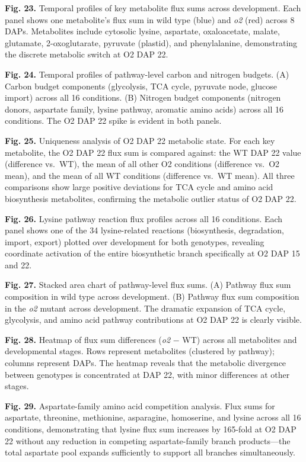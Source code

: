 \documentclass[12pt,a4paper]{article}
\begin{document}
\textbf{Fig. 23.} Temporal profiles of key metabolite flux sums across development. Each panel shows one metabolite's flux sum in wild type (blue) and \textit{o2} (red) across 8 DAPs. Metabolites include cytosolic lysine, aspartate, oxaloacetate, malate, glutamate, 2-oxoglutarate, pyruvate (plastid), and phenylalanine, demonstrating the discrete metabolic switch at O2 DAP 22.

\textbf{Fig. 24.} Temporal profiles of pathway-level carbon and nitrogen budgets. (A) Carbon budget components (glycolysis, TCA cycle, pyruvate node, glucose import) across all 16 conditions. (B) Nitrogen budget components (nitrogen donors, aspartate family, lysine pathway, aromatic amino acids) across all 16 conditions. The O2 DAP 22 spike is evident in both panels.

\textbf{Fig. 25.} Uniqueness analysis of O2 DAP 22 metabolic state. For each key metabolite, the O2 DAP 22 flux sum is compared against: the WT DAP 22 value (difference vs.\ WT), the mean of all other O2 conditions (difference vs.\ O2 mean), and the mean of all WT conditions (difference vs.\ WT mean). All three comparisons show large positive deviations for TCA cycle and amino acid biosynthesis metabolites, confirming the metabolic outlier status of O2 DAP 22.

\textbf{Fig. 26.} Lysine pathway reaction flux profiles across all 16 conditions. Each panel shows one of the 34 lysine-related reactions (biosynthesis, degradation, import, export) plotted over development for both genotypes, revealing coordinate activation of the entire biosynthetic branch specifically at O2 DAP 15 and 22.

\textbf{Fig. 27.} Stacked area chart of pathway-level flux sums. (A) Pathway flux sum composition in wild type across development. (B) Pathway flux sum composition in the \textit{o2} mutant across development. The dramatic expansion of TCA cycle, glycolysis, and amino acid pathway contributions at O2 DAP 22 is clearly visible.

\textbf{Fig. 28.} Heatmap of flux sum differences (\textit{o2} $-$ WT) across all metabolites and developmental stages. Rows represent metabolites (clustered by pathway); columns represent DAPs. The heatmap reveals that the metabolic divergence between genotypes is concentrated at DAP 22, with minor differences at other stages.

\textbf{Fig. 29.} Aspartate-family amino acid competition analysis. Flux sums for aspartate, threonine, methionine, asparagine, homoserine, and lysine across all 16 conditions, demonstrating that lysine flux sum increases by 165-fold at O2 DAP 22 without any reduction in competing aspartate-family branch products---the total aspartate pool expands sufficiently to support all branches simultaneously.
\end{document}
